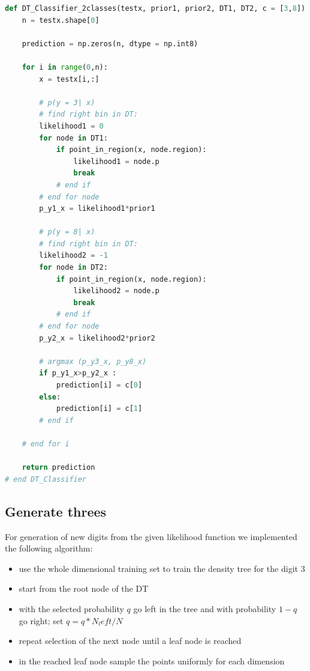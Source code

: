 \documentclass{article}
\begin{document}
\FloatBarrier

\begin{lstlisting}[language=Python]
def DT_Classifier_2classes(testx, prior1, prior2, DT1, DT2, c = [3,8]):
    n = testx.shape[0]
    
    prediction = np.zeros(n, dtype = np.int8)
    
    for i in range(0,n):
        x = testx[i,:]
            
        # p(y = 3| x)
        # find right bin in DT:
        likelihood1 = 0
        for node in DT1:
            if point_in_region(x, node.region):
                likelihood1 = node.p
                break 
            # end if
        # end for node
        p_y1_x = likelihood1*prior1
           
        # p(y = 8| x) 
        # find right bin in DT:
        likelihood2 = -1
        for node in DT2:
            if point_in_region(x, node.region):
                likelihood2 = node.p
                break 
            # end if
        # end for node        
        p_y2_x = likelihood2*prior2
           
        # argmax (p_y3_x, p_y8_x) 
        if p_y1_x>p_y2_x :
            prediction[i] = c[0]
        else:
            prediction[i] = c[1]
        # end if        
           
    # end for i
    
    return prediction
# end DT_Classifier
\end{lstlisting}


\subsection{Generate threes}
For generation of new digits from the given likelihood function we implemented the following algorithm:
\begin{itemize}
\item use the whole dimensional training set to train the density tree for the digit $3$
\item start from the root node of the DT
\item with the selected probability $q$ go left in the tree and with probability $1-q$ go right; set $q=q*N_left/N$
\item repeat selection of the next node until a leaf node is reached
\item in the reached leaf node sample the points uniformly for each dimension
\end{itemize}
\end{document}
